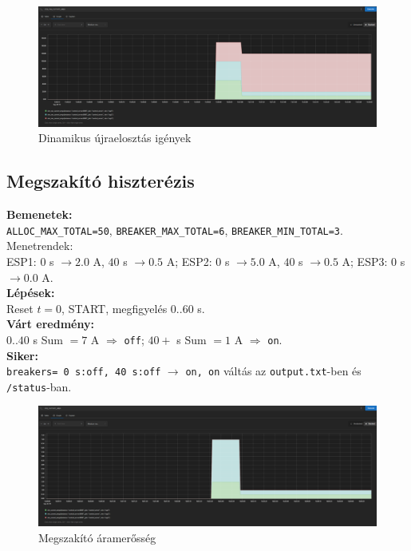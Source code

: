 \begin{figure}[H]
    \centering
    \includegraphics[width=1\textwidth]{figures/dinamikus újraelosztás_4_2.png}
    \caption{Dinamikus újraelosztás igények}
    \label{fig:dynamic_reallocation_2}
\end{figure}

\subsection{Megszakító hiszterézis}
\textbf{Bemenetek:}\\ \texttt{ALLOC\_MAX\_TOTAL=50}, \texttt{BREAKER\_MAX\_TOTAL=6}, 
\texttt{BREAKER\_MIN\_TOTAL=3}. Menetrendek: \\
ESP1: \(0\) s \(\to 2.0\) A, \(40\) s \(\to 0.5\) A; \;
ESP2: \(0\) s \(\to 5.0\) A, \(40\) s \(\to 0.5\) A; \;
ESP3: \(0\) s \(\to 0.0\) A.\\
\textbf{Lépések:}\\ Reset \(t{=}0\), START, megfigyelés \(0..60\) s.\\
\textbf{Várt eredmény:}\\ \(0..40\) s Sum \(=7\) A \(\Rightarrow\) \texttt{off}; \(40+\) 
s Sum \(=1\) A \(\Rightarrow\) \texttt{on}.\\
\textbf{Siker:}\\ \texttt{breakers= 0 s:off, 40 s:off} \(\to\) \texttt{on,\ on} váltás 
az \texttt{output.txt}-ben és \texttt{/status}-ban.

\begin{figure}[H]
    \centering
    \includegraphics[width=1\textwidth]{figures/megszakító_5_1.png}
    \caption{Megszakító áramerősség}
    \label{fig:megszakító_1}
\end{figure}

